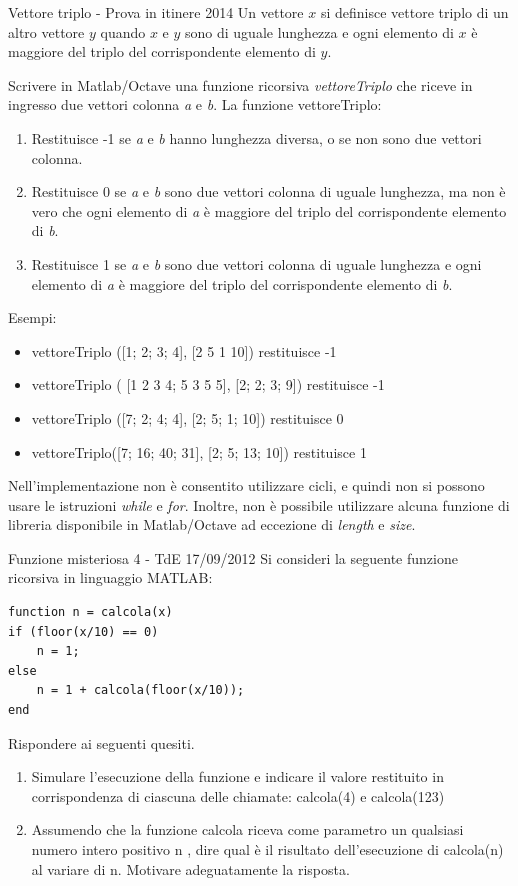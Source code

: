 \documentclass[format=169, handout]{beamer}
\begin{document}
\begin{frame}[allowframebreaks]{Vettore triplo - Prova in itinere 2014}
Un vettore $x$ si definisce vettore triplo di un altro vettore $y$ quando $x$ e
$y$ sono di uguale lunghezza e ogni elemento di $x$ è maggiore del triplo
del corrispondente elemento di $y$.

Scrivere in Matlab/Octave una funzione \alert{ricorsiva} \emph{vettoreTriplo} che
riceve in ingresso due vettori \alert{colonna} \emph{a} e \emph{b}. La funzione
vettoreTriplo:
\begin{enumerate}
	\item Restituisce -1 se \emph{a} e \emph{b} hanno lunghezza diversa, o se non sono due vettori colonna.
	\item Restituisce 0 se \emph{a} e \emph{b} sono due vettori colonna di uguale
	lunghezza, ma non è vero che ogni elemento di \emph{a} è maggiore
	del triplo del corrispondente elemento di \emph{b}.
	\item Restituisce 1 se \emph{a} e \emph{b} sono due vettori colonna di uguale
	lunghezza e ogni elemento di \emph{a} è maggiore
	del triplo del corrispondente elemento di \emph{b}.
\end{enumerate}

Esempi:
\begin{itemize}
	\item vettoreTriplo ([1; 2; 3; 4], [2 5 1 10]) restituisce -1
	\item vettoreTriplo ( [1 2 3 4; 5 3 5 5], [2; 2; 3; 9]) restituisce -1
	\item vettoreTriplo ([7; 2; 4; 4], [2; 5; 1; 10]) restituisce 0
	\item vettoreTriplo([7; 16; 40; 31], [2; 5; 13; 10]) restituisce 1
\end{itemize}

Nell’implementazione \alert{non} è consentito utilizzare cicli, e quindi \alert{non} si possono usare le istruzioni \emph{while} e \emph{for}. Inoltre, \alert{non} è possibile utilizzare alcuna funzione di libreria disponibile in Matlab/Octave ad eccezione di \emph{length} e \emph{size}.
\end{frame}


\begin{frame}{Funzione misteriosa 4 - TdE 17/09/2012}
Si consideri la seguente funzione ricorsiva in linguaggio MATLAB:
\begin{lstlisting}[style=matlab=]
function n = calcola(x)
if (floor(x/10) == 0)
    n = 1;
else
    n = 1 + calcola(floor(x/10));
end
\end{lstlisting}

Rispondere ai seguenti quesiti.
\begin{enumerate}
	\item Simulare l'esecuzione della funzione e indicare il valore restituito in corrispondenza di ciascuna delle
	chiamate: calcola(4) e calcola(123)
	\item 
	Assumendo che la funzione calcola riceva come parametro un qualsiasi numero intero positivo n , dire qual
	è il risultato dell'esecuzione di calcola(n) al variare di n. Motivare adeguatamente la risposta.
\end{enumerate}
\end{frame}
\end{document}
